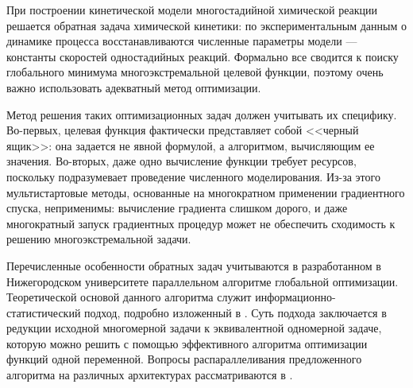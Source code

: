 \documentclass{cmi}
\begin{document}
При построении кинетической модели многостадийной химической реакции решается обратная задача химической кинетики: по экспериментальным данным о динамике процесса восстанавливаются численные параметры модели --- константы скоростей одностадийных реакций. Формально все сводится к поиску глобального минимума многоэкстремальной целевой функции, поэтому очень важно использовать адекватный метод оптимизации.


Метод решения таких оптимизационных задач должен учитывать их специфику. Во-первых, целевая функция фактически представляет собой <<черный ящик>>: она задается не явной формулой, а алгоритмом, вычисляющим ее значения. Во-вторых, даже одно вычисление функции требует ресурсов, поскольку подразумевает проведение численного моделирования. Из-за этого мультистартовые методы, основанные на многократном применении градиентного спуска, неприменимы: вычисление градиента слишком дорого, и даже многократный запуск градиентных процедур может не обеспечить сходимость к решению многоэкстремальной задачи.

Перечисленные особенности обратных задач учитываются в разработанном в Нижегородском университете параллельном алгоритме глобальной оптимизации. Теоретической основой данного алгоритма служит информационно-статистический подход, подробно изложенный в \cite{Strongin2000}. Суть подхода заключается в редукции исходной многомерной задачи к эквивалентной одномерной задаче, которую можно решить с помощью эффективного алгоритма оптимизации функций одной переменной. Вопросы распараллеливания предложенного алгоритма на различных архитектурах рассматриваются в \cite{Barkalov2016}.
\end{document}
